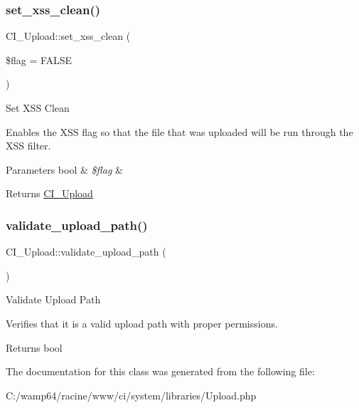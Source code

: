 \subsubsection{\texorpdfstring{set\+\_\+xss\+\_\+clean()}{set\_xss\_clean()}}
{\footnotesize\ttfamily C\+I\+\_\+\+Upload\+::set\+\_\+xss\+\_\+clean (\begin{DoxyParamCaption}\item[{}]{\$flag = {\ttfamily FALSE} }\end{DoxyParamCaption})}

Set X\+SS Clean

Enables the X\+SS flag so that the file that was uploaded will be run through the X\+SS filter.


\begin{DoxyParams}[1]{Parameters}
bool & {\em \$flag} & \\
\hline
\end{DoxyParams}
\begin{DoxyReturn}{Returns}
\mbox{\hyperlink{class_c_i___upload}{C\+I\+\_\+\+Upload}} 
\end{DoxyReturn}
\mbox{\label{class_c_i___upload_ab590b2fa695e3a6ea55c4cdfb6558673}} 
\subsubsection{\texorpdfstring{validate\+\_\+upload\+\_\+path()}{validate\_upload\_path()}}
{\footnotesize\ttfamily C\+I\+\_\+\+Upload\+::validate\+\_\+upload\+\_\+path (\begin{DoxyParamCaption}{ }\end{DoxyParamCaption})}

Validate Upload Path

Verifies that it is a valid upload path with proper permissions.

\begin{DoxyReturn}{Returns}
bool 
\end{DoxyReturn}


The documentation for this class was generated from the following file\+:\begin{DoxyCompactItemize}
\item 
C\+:/wamp64/racine/www/ci/system/libraries/Upload.\+php\end{DoxyCompactItemize}
